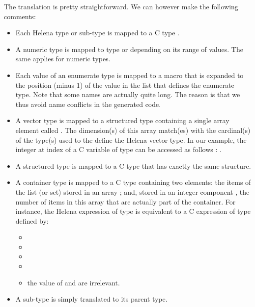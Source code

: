 The translation is pretty straightforward.  We can however make the
following comments:
\begin{itemize}
\item Each Helena type or sub-type  is mapped to a C type
  .
\item A numeric type is mapped to type  or 
  depending on its range of values.  The same applies for numeric
  types.
\item Each value  of an enumerate type  is mapped to a
  macro  that is expanded to the position
  (minus 1) of the value in the list that defines the enumerate type.
  Note that some names are actually quite long.  The reason is that we
  thus avoid name conflicts in the generated code.
\item A vector type  is mapped to a structured type containing
  a single array element called .  The dimension(s) of
  this array match(es) with the cardinal(s) of the type(s) used to the
  define the Helena vector type.  In our example, the integer at index
   of a C variable  of type
   can be accessed as follows :
  .
\item A structured type is mapped to a C  type that has
  exactly the same structure.
\item A container type  is mapped to a C  type
   containing two elements: the items of the list (or
  set) stored in an array ; and, stored in an integer
  component , the number of items in this array that are
  actually part of the container.  For instance, the Helena expression
   of type  is equivalent to a
  C expression  of type  defined by:
  \begin{itemize}
  \item{}
  \item{}
  \item{}
  \item{}
  \item the value of  and  are irrelevant.
  \end{itemize}
\item A sub-type is simply translated to its parent type.
\end{itemize}
